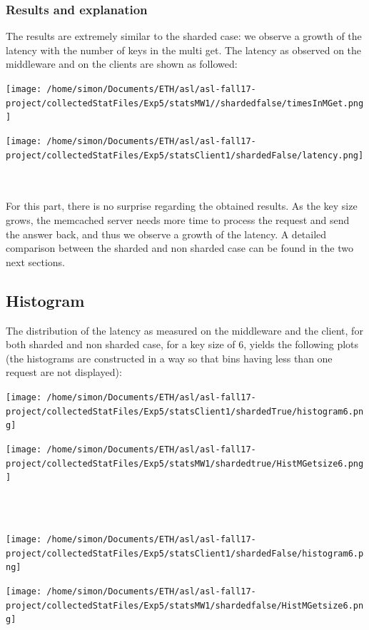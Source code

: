 \documentclass[11pt,a4paper]{article}
\begin{document}
\subsubsection{Results and explanation}

The results are extremely similar to the sharded case: we observe a growth of the latency with the number of keys in the multi get. The latency as observed on the middleware and on the clients are shown as followed: 
\\
\begin{minipage}{0.5\linewidth}
\texttt{[image: /home/simon/Documents/ETH/asl/asl-fall17-project/collectedStatFiles/Exp5/statsMW1//shardedfalse/timesInMGet.png]}
\end{minipage}
\hfill
\begin{minipage}{0.5\linewidth}
\texttt{[image: /home/simon/Documents/ETH/asl/asl-fall17-project/collectedStatFiles/Exp5/statsClient1/shardedFalse/latency.png]}
\end{minipage}
\\\\
For this part, there is no surprise regarding the obtained results. As the key size grows, the memcached server needs more time to process the request and send the answer back, and thus we observe a growth of the latency. A detailed comparison between the sharded and non sharded case can be found in the two next sections. 

\subsection{Histogram}

The distribution of the latency as measured on the middleware and the client, for both sharded and non sharded case, for a key size of 6, yields the following plots (the histograms are constructed in a way so that bins having less than one request are not displayed):
\\
\begin{minipage}{0.5\linewidth}
\texttt{[image: /home/simon/Documents/ETH/asl/asl-fall17-project/collectedStatFiles/Exp5/statsClient1/shardedTrue/histogram6.png]}
\end{minipage}
\hfill
\begin{minipage}{0.5\linewidth}
\texttt{[image: /home/simon/Documents/ETH/asl/asl-fall17-project/collectedStatFiles/Exp5/statsMW1/shardedtrue/HistMGetsize6.png]}
\end{minipage}
\\
\\
\begin{minipage}{0.5\linewidth}
\texttt{[image: /home/simon/Documents/ETH/asl/asl-fall17-project/collectedStatFiles/Exp5/statsClient1/shardedFalse/histogram6.png]}
\end{minipage}
\hfill
\begin{minipage}{0.5\linewidth}
\texttt{[image: /home/simon/Documents/ETH/asl/asl-fall17-project/collectedStatFiles/Exp5/statsMW1/shardedfalse/HistMGetsize6.png]}
\end{minipage}
\end{document}
